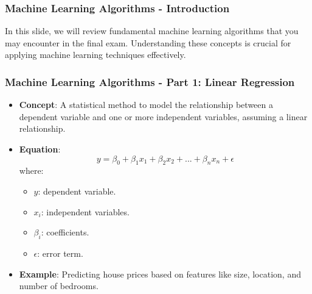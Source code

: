 \documentclass[aspectratio=169]{beamer}
\begin{document}
\begin{frame}[fragile]
    \frametitle{Machine Learning Algorithms - Introduction}
    In this slide, we will review fundamental machine learning algorithms that you may encounter in the final exam. Understanding these concepts is crucial for applying machine learning techniques effectively.
\end{frame}

\begin{frame}[fragile]
    \frametitle{Machine Learning Algorithms - Part 1: Linear Regression}
    \begin{itemize}
        \item \textbf{Concept}: A statistical method to model the relationship between a dependent variable and one or more independent variables, assuming a linear relationship.
        
        \item \textbf{Equation}:
        \begin{equation}
            y = \beta_0 + \beta_1 x_1 + \beta_2 x_2 + ... + \beta_n x_n + \epsilon
        \end{equation}
        where:
        \begin{itemize}
            \item $y$: dependent variable.
            \item $x_i$: independent variables.
            \item $\beta_i$: coefficients.
            \item $\epsilon$: error term.
        \end{itemize}
        
        \item \textbf{Example}: Predicting house prices based on features like size, location, and number of bedrooms.
    \end{itemize}
\end{frame}
\end{document}
